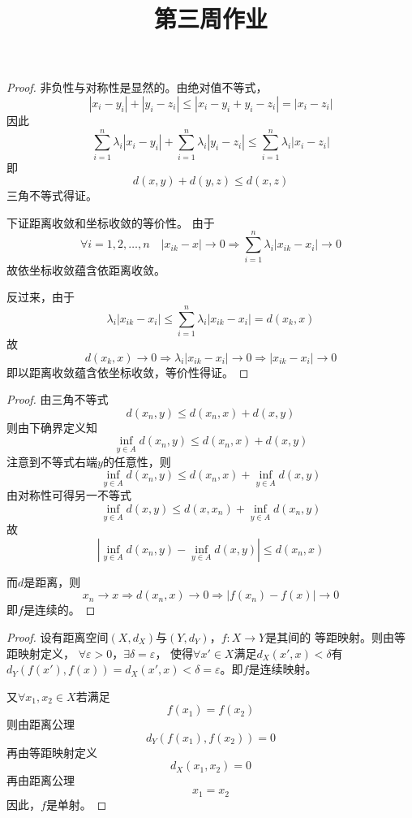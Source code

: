 \documentclass[cn]{homework}
\title{第三周作业}
\begin{document}
    \maketitle

    \problem
    \begin{proof}
        非负性与对称性是显然的。由绝对值不等式，
        \[|x_i-y_i|+|y_i-z_i|\leq|x_i-y_i+y_i-z_i|=|x_i-z_i|\]
        因此
        \[\sum_{i=1}^n\lambda_i|x_i-y_i|
        +\sum_{i=1}^n\lambda_i|y_i-z_i|
        \leq\sum_{i=1}^n\lambda_i|x_i-z_i|\]
        即
        \[d(x,y)+d(y,z)\leq d(x,z)\]
        三角不等式得证。

        下证距离收敛和坐标收敛的等价性。
        由于
        \[\forall i=1,2,\ldots,n\quad |x_{ik}-x|\to 0\Rightarrow
        \sum_{i=1}^n\lambda_i|x_{ik}-x_i|\to 0\]
        故依坐标收敛蕴含依距离收敛。

        反过来，由于
        \[\lambda_i|x_{ik}-x_i|\leq\sum_{i=1}^n\lambda_i|x_{ik}-x_i|
        =d(x_k,x)\]
        故
        \[d(x_k,x)\to 0\Rightarrow \lambda_i|x_{ik}-x_i|\to 0
        \Rightarrow |x_{ik}-x_i|\to 0\]
        即以距离收敛蕴含依坐标收敛，等价性得证。
    \end{proof}    
    
    \problem
    \begin{proof}
        \newcommand{\infy}{\inf_{y\in A}}
        \newcommand{\supy}{\sup_{y\in A}}
        由三角不等式
        \[d(x_n,y)\leq d(x_n,x)+d(x,y)\]
        则由下确界定义知
        \[\infy d(x_n,y)\leq d(x_n,x)+d(x,y)\]
        注意到不等式右端$y$的任意性，则
        \[\infy d(x_n,y)\leq d(x_n,x)+\infy d(x,y)\]
        由对称性可得另一不等式
        \[\infy d(x,y)\leq d(x,x_n)+\infy d(x_n,y)\]
        故
        \[\left|\infy d(x_n,y)-\infy d(x,y)\right|
        \leq d(x_n,x)\]

        而$d$是距离，则
        \[x_n\to x\Rightarrow d(x_n,x)\to 0
        \Rightarrow |f(x_n)-f(x)|\to 0\]
        即$f$是连续的。
    \end{proof}

    \problem
    \begin{proof}
        设有距离空间$(X,d_X)$与$(Y,d_Y)$，$f:X\to Y$是其间的
        等距映射。则由等距映射定义，
        $\forall\varepsilon>0$，$\exists\delta=\varepsilon$，
        使得$\forall x'\in X$满足$d_X(x',x)<\delta$有$d_Y(f(x'),f(x))
        =d_X(x',x)<\delta=\varepsilon$。即$f$是连续映射。

        又$\forall x_1,x_2\in X$若满足
        \[f(x_1)=f(x_2)\]
        则由距离公理
        \[d_Y(f(x_1),f(x_2))=0\]
        再由等距映射定义
        \[d_X(x_1,x_2)=0\]
        再由距离公理
        \[x_1=x_2\]
        因此，$f$是单射。
    \end{proof}
\end{document}
